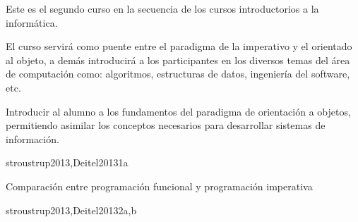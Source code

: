 
\begin{syllabus}


\begin{justification}
Este es el segundo curso en la secuencia de los cursos introductorios a la informática.

El curso servirá como puente entre el paradigma de la imperativo y el orientado al objeto, a demás introducirá a los participantes en los diversos temas del área de computación como: algoritmos, estructuras de datos, ingeniería del software, etc.
\end{justification}

\begin{goals}
\item Introducir al alumno a los fundamentos del paradigma de
      orientación a objetos, permitiendo asimilar los conceptos
      necesarios para desarrollar  sistemas de información.
\end{goals}

\begin{outcomes}
\end{outcomes}

\begin{unit}{\PLOverviewDef}{stroustrup2013,Deitel2013}{1}{a}
   \begin{topics}
      \item \PLOverviewTopicBrief
      \item Comparación entre programación funcional y programación imperativa
      \item \PLOverviewTopicHistory
   \end{topics}

   \begin{learningoutcomes}
      \item \PLOverviewObjONE
      \item \PLOverviewObjTWO
      \item \PLOverviewObjTHREE
   \end{learningoutcomes}
\end{unit}

\begin{unit}{\PLVirtualMachinesDef}{stroustrup2013,Deitel2013}{2}{a,b}
   \begin{topics}
      \item \PLVirtualMachinesTopicETheconcept%
      \item \PLVirtualMachinesTopicHierarchy%
      \item \PLVirtualMachinesTopicIntermediate%
   \end{topics}


\end{unit}
\end{syllabus}
